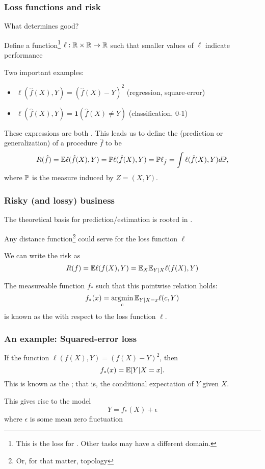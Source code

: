 \documentclass{beamer}
\begin{document}

\begin{frame}
\frametitle{Loss functions and risk}
What determines good?
\vsp

Define a function\footnote{This is the loss for .  Other tasks may
have a different domain.} $\ell:\R\times\R \rightarrow \R$ such that smaller values of $\ell$ indicate  performance

\vsp 
Two important examples:
\begin{itemize}
\item $\ell(\hat{f}(X),Y) = (\hat{f}(X) - Y)^2$ (regression, square-error)
\item $\ell(\hat{f}(X),Y) = \mathbf{1}(\hat{f}(X) \neq Y)$ (classification, 0-1)
\end{itemize}

\vsp

These expressions are both .  This leads us to define the (prediction or generalization)  of a procedure $\hat f$ to be
\[
R(\hat f) = \E\ell(\hat{f}(X),Y) = \P\ell(\hat{f}(X),Y) = \P\ell_{\hat{f}}= \int \ell(\hat{f}(X),Y) d\P,
\]
where $\P$ is the measure induced by $Z = (X,Y)$.
\vsp

\end{frame}


\begin{frame}
\frametitle{Risky (and lossy) business}
The theoretical basis for prediction/estimation is rooted in
.

\vsp
Any distance function\footnote{Or, for that matter, topology} could serve for the loss
function $\ell$

\vsp
We can write the risk as
\[
R(f) = \E \ell(f(X),Y) = \E_X \E_{Y|X} \ell(f(X),Y)
\]

\vsp
The measureable function $f_*$ such that this pointwise relation holds:
\[
f_*(x) = \argmin_c \E_{Y|X=x} \ell(c,Y)
\]
is known as the  with respect to the loss function $\ell$.
\end{frame}

\begin{frame}
\frametitle{An example: Squared-error loss}
If the function $\ell(f(X),Y) = (f(X) - Y)^2$, then
\[
f_*(x) = \E [Y | X= x].
\]
This is known as the ; that is, the conditional expectation
of $Y$ given $X$.

\vsp

\vsp
This gives rise to the model
\[
Y = f_*(X) + \epsilon
\]
where $\epsilon$ is some mean zero fluctuation

\end{frame}
\end{document}
